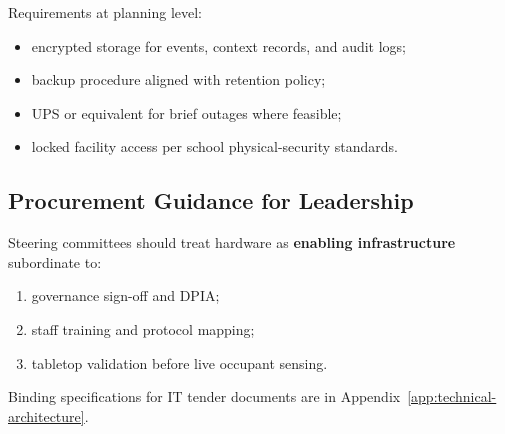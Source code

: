 Requirements at planning level:
\begin{itemize}[noitemsep]
  \item encrypted storage for events, context records, and audit logs;
  \item backup procedure aligned with retention policy;
  \item UPS or equivalent for brief outages where feasible;
  \item locked facility access per school physical-security standards.
\end{itemize}

\subsection{Procurement Guidance for Leadership}

Steering committees should treat hardware as \textbf{enabling infrastructure} subordinate to:
\begin{enumerate}[noitemsep]
  \item governance sign-off and DPIA;
  \item staff training and protocol mapping;
  \item tabletop validation before live occupant sensing.
\end{enumerate}

Binding specifications for IT tender documents are in Appendix~\ref{app:technical-architecture}.
